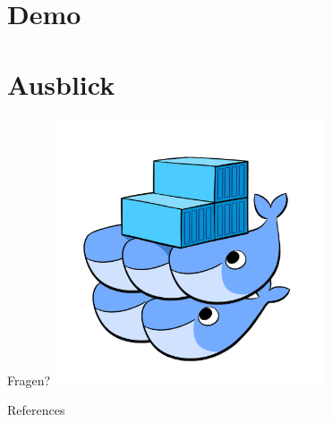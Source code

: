 \documentclass[10pt]{beamer}
\begin{document}
\section{Demo}

\section{Ausblick}

\begin{frame}{Fragen?}
  \center
  \includegraphics[width=0.6\textwidth]{../images/14-docker-swarm-hero2.png}

\end{frame}

\appendix

\begin{frame}[allowframebreaks]{References}

  \printbibliography

\end{frame}
\end{document}
